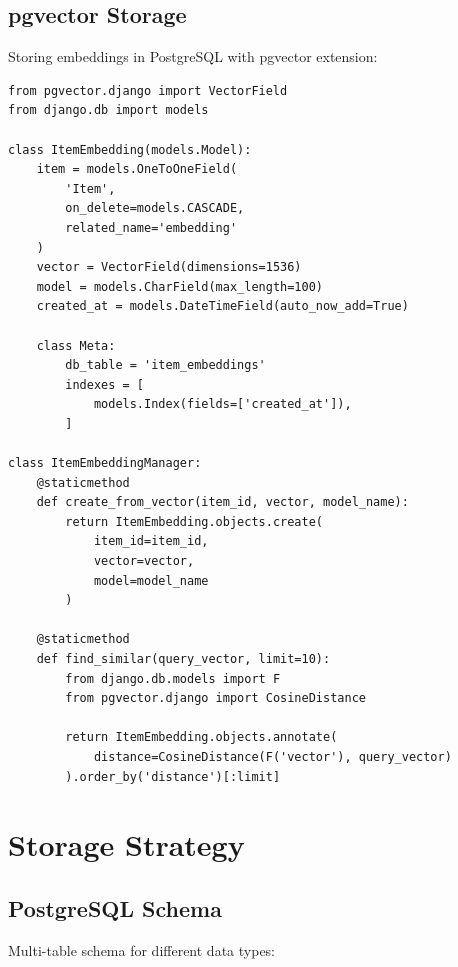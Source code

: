 \documentclass[12pt,a4paper]{report}
\begin{document}
\section{pgvector Storage}

Storing embeddings in PostgreSQL with pgvector extension:

\begin{lstlisting}
from pgvector.django import VectorField
from django.db import models

class ItemEmbedding(models.Model):
    item = models.OneToOneField(
        'Item',
        on_delete=models.CASCADE,
        related_name='embedding'
    )
    vector = VectorField(dimensions=1536)
    model = models.CharField(max_length=100)
    created_at = models.DateTimeField(auto_now_add=True)
    
    class Meta:
        db_table = 'item_embeddings'
        indexes = [
            models.Index(fields=['created_at']),
        ]

class ItemEmbeddingManager:
    @staticmethod
    def create_from_vector(item_id, vector, model_name):
        return ItemEmbedding.objects.create(
            item_id=item_id,
            vector=vector,
            model=model_name
        )
    
    @staticmethod
    def find_similar(query_vector, limit=10):
        from django.db.models import F
        from pgvector.django import CosineDistance
        
        return ItemEmbedding.objects.annotate(
            distance=CosineDistance(F('vector'), query_vector)
        ).order_by('distance')[:limit]
\end{lstlisting}

\chapter{Storage Strategy}

\section{PostgreSQL Schema}

Multi-table schema for different data types:
\end{document}
